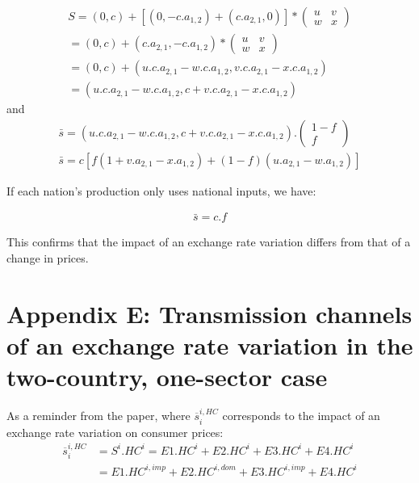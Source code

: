\documentclass[11pt,a4paper]{article} %
\begin{document}
\begin{gather*}
S =\left(0,c\right)+\left[\left(0,-c.a_{1,2}\right)+\left(c.a_{2,1},0\right)\right]*\left(\begin{matrix}u&v\\w&x\end{matrix}\right)
\\
=\left(0,c\right)+\left(c.a_{2,1},-c.a_{1,2}\right)*\left(\begin{matrix}u&v\\w&x\end{matrix}\right)
\\
=\left(0,c\right)+\left(u.c.a_{2,1}-w.c.a_{1,2},v.c.a_{2,1}-x.c.a_{1,2}\right)
\\
=\left(u.c.a_{2,1}-w.c.a_{1,2},c+v.c.a_{2,1}-x.c.a_{1,2}\right)
\end{gather*}
and
\begin{gather*}
\bar{s}=\left(u.c.a_{2,1}-w.c.a_{1,2},c+v.c.a_{2,1}-x.c.a_{1,2}\right).\left(\begin{matrix}1-f\\f\end{matrix}\right)
\\
\bar{s}=c\left[f\left(1+v.a_{2,1}-x.a_{1,2}\right)+\left(1-f\right)\left(u.a_{2,1}-w.a_{1,2}\right)\right]
\end{gather*}


If each nation's production only uses national inputs, we have:

\begin{gather*}
\bar{s}=c.f
\end{gather*}

This confirms that the impact of an exchange rate variation differs from that of a change in prices.


\newpage
\section*{Appendix E: Transmission channels of an exchange rate variation in the two-country, one-sector case}\label{AnalyticalAppendix}

As a reminder from the paper, where $\overline{s}_{i}^{i,HC}$ corresponds to the impact of an exchange rate variation on consumer prices:  
\begin{equation}
\begin{array}{lccl}
\overline{s}_{i}^{i,HC}&=S^i.HC^i=E1.HC^i+E2.HC^i+E3.HC^i+E4.HC^i \\
&=E1.HC^{i,imp}+E2.HC^{i,dom}+E3.HC^{i,imp}+E4.HC^i
\end{array} 
\end{equation}
\end{document}
